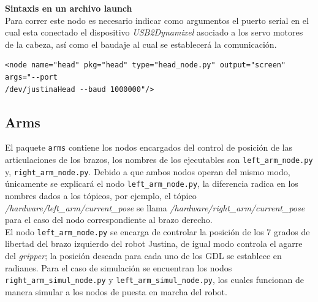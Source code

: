 \documentclass[user_manual.tex]{subfiles}
\begin{document}
\textbf{Sintaxis en un archivo launch}\\
Para correr este nodo es necesario indicar como argumentos el puerto serial en el cual esta conectado el dispositivo \textit{USB2Dynamixel} asociado a los servo motores de la cabeza, así como el baudaje al cual se establecerá la comunicación.\\
\begin{verbatim}
<node name="head" pkg="head" type="head_node.py" output="screen" args="--port 
/dev/justinaHead --baud 1000000"/>
\end{verbatim}

\subsection{Arms}
El paquete \texttt{arms} contiene los nodos encargados del control de posición de las articulaciones de los brazos, los nombres de los ejecutables son \texttt{left\_arm\_node.py} y, \texttt{right\_arm\_node.py}. Debido a que ambos nodos operan del mismo modo, únicamente se explicará el nodo \texttt{left\_arm\_node.py}, la diferencia radica en los nombres dados a los tópicos, por ejemplo, el tópico \textit{/hardware/left\_arm/current\_pose} se llama \textit{/hardware/right\_arm/current\_pose} para el caso del nodo correspondiente al brazo derecho.\\

El nodo \texttt{left\_arm\_node.py} se encarga de controlar la posición de los 7 grados de libertad del brazo izquierdo del robot Justina, de igual modo controla el agarre del \textit{gripper}; la posición deseada para cada uno de los GDL se establece en radianes. Para el caso de simulación se encuentran los nodos \texttt{right\_arm\_simul\_node.py} y \texttt{left\_arm\_simul\_node.py}, los cuales funcionan de manera simular a los nodos de puesta en marcha del robot.
\end{document}
